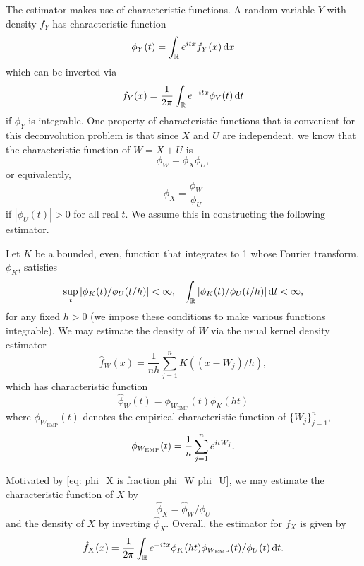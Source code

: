 	The estimator makes use of characteristic functions. A random variable $Y$ with density $f_Y$ has characteristic function
	\begin{equation}
		\phi_Y(t) = \int_\mathbb{R} e^{i t x} f_Y(x) \, \mathrm{d} x
	\end{equation}
	which can be inverted via
	\begin{equation}
		f_Y(x) = \frac{1}{2\pi} \int_\mathbb{R} e^{-itx} \phi_Y(t) \, \mathrm{d} t
	\end{equation}
	if $\phi_Y$ is integrable. One property of characteristic functions that is convenient for this deconvolution problem is that since $X$ and $U$ are independent, we know that the characteristic function of $W = X+ U$ is
	\begin{equation}
		\phi_W = \phi_X \phi_U,
	\end{equation}
	or equivalently,
	\begin{equation}
		\phi_X = \frac{\phi_W}{\phi_U}
		\label{eq: phi_X is fraction phi_W phi_U}
	\end{equation}
	if $|\phi_U(t)| > 0$ for all real $t$. We assume this in constructing the following estimator.

	Let $K$ be a bounded, even, function that integrates to 1 whose Fourier transform, $\phi_K$, satisfies
	\begin{align}
		\sup_t |\phi_K(t) / \phi_U(t / h) | < \infty, &&\int_\mathbb{R} |\phi_K(t) / \phi_U(t / h)| \, \mathrm{d} t < \infty,
		\label{eq:phiK conditions error known}
	\end{align}
	for any fixed $h > 0$ (we impose these conditions to make various functions integrable). We may estimate the density of $W$ via the usual kernel density estimator \cite[Section 20.3]{Wasserman2003-ot}
	\begin{equation}
		\hat{f}_W(x) = \frac{1}{n h} \sum_{j = 1}^n K((x - W_j)/h),
	\end{equation}
	which has characteristic function
	\begin{equation}
		\hat{\phi}_W(t) = \phi_{W_\mathrm{EMP}}(t) \phi_K(h t)
	\end{equation}
	where $\phi_{W_\mathrm{EMP}}(t)$ denotes the empirical characteristic function of $\{W_j\}_{j = 1}^n$,
	\begin{equation}
		\phi_{W_\mathrm{EMP}}(t) = \frac{1}{n}\sum_{j = 1}^n e^{itW_j}.
	\end{equation}

	Motivated by \eqref{eq: phi_X is fraction phi_W phi_U}, we may estimate the characteristic function of $X$ by 
	\begin{equation}
		\hat{\phi}_X = \hat{\phi}_W / \phi_U
	\end{equation}
	and the density of $X$ by inverting $\hat{\phi}_X$. Overall, the estimator for $f_X$ is given by
	\begin{equation}
	\label{eq:standard deconvolution estimator}
		\hat{f}_X(x) = \frac{1}{2\pi} \int_\mathbb{R} e^{-itx} \phi_K(ht) \phi_{W_\mathrm{EMP}}(t)  / \phi_U(t) \, \mathrm{d} t.
	\end{equation}

